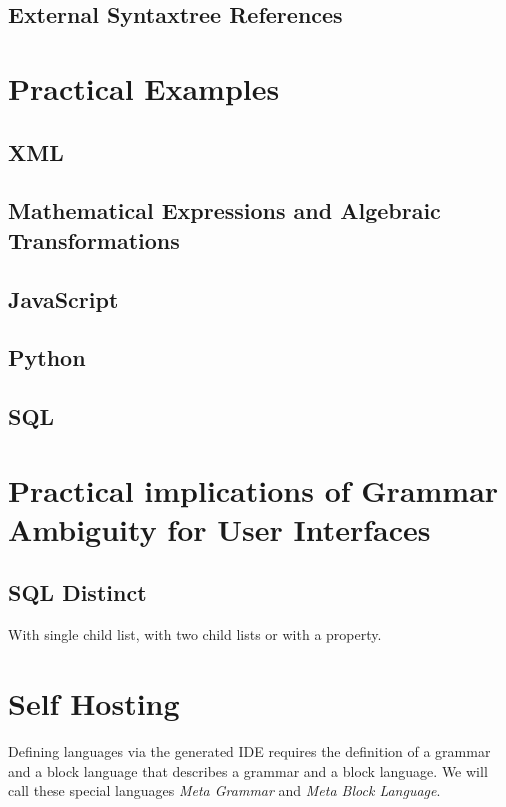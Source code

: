 \subsection{External Syntaxtree References}

\section{Practical Examples}

\subsection{XML}

\subsection{Mathematical Expressions and Algebraic Transformations}

\subsection{JavaScript}

\subsection{Python}

\subsection{SQL}

\section{Practical implications of Grammar Ambiguity for User Interfaces}

\subsection{SQL Distinct}

With single child list, with two child lists or with a property.

\section{Self Hosting}

Defining languages via the generated IDE requires the definition of a grammar and a block language that describes a grammar and a block language. We will call these special languages \textit{Meta Grammar} and \textit{Meta Block Language}.

